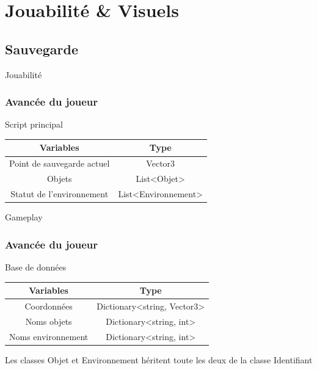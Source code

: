 \section{Jouabilité \& Visuels}
\subsection{Sauvegarde}
\begin{frame}{Jouabilité}
\frametitle{Avancée du joueur}
\setlength{\parindent}{5ex}
Script principal
\begin{center}
\begin{tabular}{|c||c|}
\hline
    \textbf{Variables} & \textbf{Type} \\
\hline
    Point de sauvegarde actuel & Vector3 \\
\hline
    Objets & List<Objet> \\
\hline
    Statut de l'environnement & List<Environnement> \\
\hline
\end{tabular}
\end{center}
\end{frame}

\begin{frame}{Gameplay}
\frametitle{Avancée du joueur}
\setlength{\parindent}{5ex}
Base de données
\begin{center}
\begin{tabular}{|c||c|}
\hline
    \textbf{Variables} & \textbf{Type} \\
\hline
    Coordonnées & Dictionary<string, Vector3> \\
\hline
    Noms objets & Dictionary<string, int> \\
\hline
    Noms environnement & Dictionary<string, int> \\
\hline
\end{tabular}
\end{center}
\par Les classes Objet et Environnement héritent toute les deux de la classe Identifiant
\end{frame}


